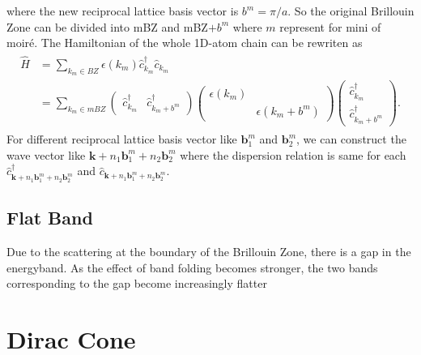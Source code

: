 \documentclass[10pt, oneside]{article}
\newcommand{\p}[1]{\left(#1\right)}
\begin{document}
where the new reciprocal lattice basis vector is \(b^{m} = \pi/a\). So the original Brillouin Zone can be divided into mBZ and mBZ\(+ b^{m}\) where \(m\) represent for mini of moiré. The Hamiltonian  of the whole 1D-atom chain can be rewriten as
\begin{align}
	\begin{split}
		\hat{H} & = \sum_{k_m \in BZ} \epsilon\p{k_{m}} \hat{c}^{\dagger}_{k_m} \hat{c}_{k_m} \\
		& = \sum_{k_m \in mBZ} \begin{pmatrix}
			\hat{c}^{\dagger}_{k_m} & \hat{c}^{\dagger}_{k_m + b^m}
		\end{pmatrix} \begin{pmatrix}
			\epsilon\p{k_{m}} & \\
			  &  \epsilon\p{k_{m} + b^m}
		\end{pmatrix} \begin{pmatrix}
			\hat{c}^{\dagger}_{k_m} \\ \hat{c}^{\dagger}_{k_m + b^m}
		\end{pmatrix}.
	\end{split}
\end{align}
For different reciprocal lattice basis vector like \(\bm{b}^{m}_{1}\) and  \(\bm{b}^{m}_{2}\), we can construct the wave vector like \(\bm{k} + n_{1} \bm{b}^{m}_{1} + n_2 \bm{b}^{m}_{2}\) where the dispersion relation is same for each \(\hat{c}^{\dagger}_{\bm{k} + n_{1} \bm{b}^{m}_{1} + n_2 \bm{b}^{m}_{2}}\) and \(\hat{c}_{\bm{k} + n_{1} \bm{b}^{m}_{1} + n_2 \bm{b}^{m}_{2}}\).


\subsection{Flat Band}
Due to the scattering at the boundary of the Brillouin Zone, there is a gap in the energyband. As the effect of band folding becomes stronger, the two bands corresponding to the gap become increasingly flatter



\section{Dirac Cone}
\end{document}
